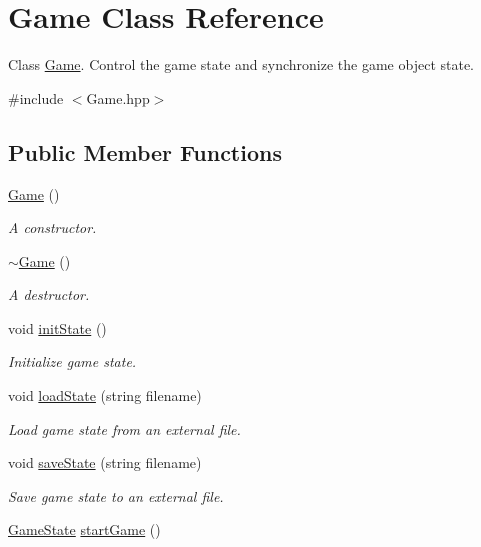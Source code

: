 \hypertarget{class_game}{}\section{Game Class Reference}
\label{class_game}


Class \mbox{\hyperlink{class_game}{Game}}. Control the game state and synchronize the game object state.  




{\ttfamily \#include $<$Game.\+hpp$>$}

\subsection*{Public Member Functions}
\begin{DoxyCompactItemize}
\item 
\mbox{\hyperlink{class_game_ad59df6562a58a614fda24622d3715b65}{Game}} ()
\begin{DoxyCompactList}\small\item\em A constructor. \end{DoxyCompactList}\item 
\mbox{\hyperlink{class_game_ae3d112ca6e0e55150d2fdbc704474530}{$\sim$\+Game}} ()
\begin{DoxyCompactList}\small\item\em A destructor. \end{DoxyCompactList}\item 
void \mbox{\hyperlink{class_game_a741532226fb50fd8113b0e2a0f162858}{init\+State}} ()
\begin{DoxyCompactList}\small\item\em Initialize game state. \end{DoxyCompactList}\item 
void \mbox{\hyperlink{class_game_a89e4124211cd2158244b9860b46c4767}{load\+State}} (string filename)
\begin{DoxyCompactList}\small\item\em Load game state from an external file. \end{DoxyCompactList}\item 
void \mbox{\hyperlink{class_game_a1d537d2349fb33959018a02eccea1c79}{save\+State}} (string filename)
\begin{DoxyCompactList}\small\item\em Save game state to an external file. \end{DoxyCompactList}\item 
\mbox{\hyperlink{_constants_8hpp_a7899b65f1ea0f655e4bbf8d2a5714285}{Game\+State}} \mbox{\hyperlink{class_game_afcca871ec55fbe14b2179bcb914d5421}{start\+Game}} ()

\end{DoxyCompactItemize}
